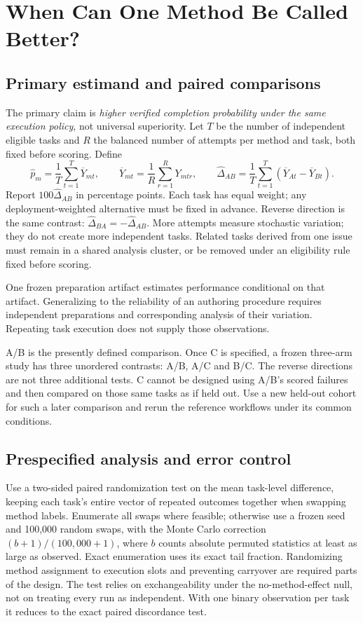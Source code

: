 \section{When Can One Method Be Called Better?}
\label{sec:comparison}

\subsection{Primary estimand and paired comparisons}
The primary claim is \emph{higher verified completion probability under the
same execution policy}, not universal superiority. Let $T$ be the number of
independent eligible tasks and $R$ the balanced number of attempts per method
and task, both fixed before scoring. Define
\[
 \widehat p_m=\frac{1}{T}\sum_{t=1}^{T}\overline Y_{mt},\qquad
 \overline Y_{mt}=\frac{1}{R}\sum_{r=1}^{R}Y_{mtr},\qquad
 \widehat\Delta_{AB}=\frac{1}{T}\sum_{t=1}^{T}
 (\overline Y_{At}-\overline Y_{Bt}).
\]
Report $100\widehat\Delta_{AB}$ in percentage points. Each task has equal weight;
any deployment-weighted alternative must be fixed in advance. Reverse direction
is the same contrast: $\widehat\Delta_{BA}=-\widehat\Delta_{AB}$.
More attempts measure stochastic variation; they do not create more independent
tasks. Related tasks derived from one issue must remain in a shared analysis
cluster, or be removed under an eligibility rule fixed before scoring.

One frozen preparation artifact estimates performance conditional on that
artifact. Generalizing to the reliability of an authoring procedure requires
independent preparations and corresponding analysis of their variation.
Repeating task execution does not supply those observations.

A/B is the presently defined comparison. Once C is specified, a frozen three-arm
study has three unordered contrasts: A/B, A/C and B/C. The reverse directions
are not three additional tests. C cannot be designed using A/B's scored failures
and then compared on those same tasks as if held out. Use a new held-out cohort
for such a later comparison and rerun the reference workflows under its common
conditions.

\subsection{Prespecified analysis and error control}
Use a two-sided paired randomization test on the mean task-level difference,
keeping each task's entire vector of repeated outcomes together when swapping
method labels. Enumerate all swaps where feasible; otherwise use a frozen seed
and 100,000 random swaps, with the Monte Carlo correction
$(b+1)/(100{,}000+1)$, where $b$ counts absolute permuted statistics at least as
large as observed. Exact enumeration uses its exact tail fraction. Randomizing
method assignment to execution slots and preventing carryover are required
parts of the design. The test relies on exchangeability under the no-method-effect
null, not on treating every run as independent. With one binary observation per
task it reduces to the exact paired discordance test.

